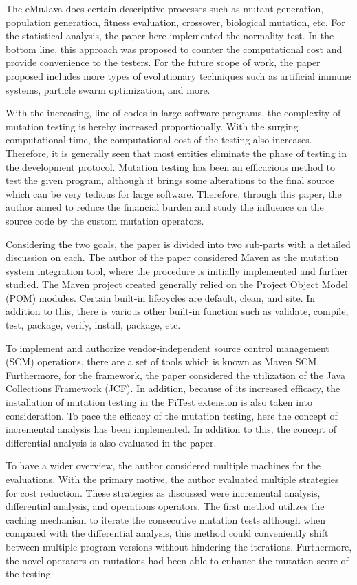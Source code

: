 The eMuJava does certain descriptive processes such as mutant generation, population generation, fitness evaluation, crossover, biological mutation, etc. For the statistical analysis, the paper here implemented the normality test. In the bottom line, this approach was proposed to counter the computational cost and provide convenience to the testers. For the future scope of work, the paper proposed includes more types of evolutionary techniques such as artificial immune systems, particle swarm optimization, and more.\par 
With the increasing, line of codes in large software programs, the complexity of mutation testing is hereby increased proportionally. With the surging computational time, the computational cost of the testing also increases. Therefore, it is generally seen that most entities eliminate the phase of testing in the development protocol. Mutation testing has been an efficacious method to test the given program, although it brings some alterations to the final source which can be very tedious for large software. Therefore, through this paper, the author aimed to reduce the financial burden and study the influence on the source code by the custom mutation operators.\par 
Considering the two goals, the paper is divided into two sub-parts with a detailed discussion on each. The author of the paper considered Maven as the mutation system integration tool, where the procedure is initially implemented and further studied. The Maven project created generally relied on the Project Object Model (POM) modules. Certain built-in lifecycles are default, clean, and site. In addition to this, there is various other built-in function such as validate, compile, test, package, verify, install, package, etc.\par 
To implement and authorize vendor-independent source control management (SCM) operations, there are a set of tools which is known as Maven SCM. Furthermore, for the framework, the paper considered the utilization of the Java Collections Framework (JCF). In addition, because of its increased efficacy, the installation of mutation testing in the PiTest extension is also taken into consideration. To pace the efficacy of the mutation testing, here the concept of incremental analysis has been implemented. In addition to this, the concept of differential analysis is also evaluated in the paper. \par 
To have a wider overview, the author considered multiple machines for the evaluations. With the primary motive, the author evaluated multiple strategies for cost reduction. These strategies as discussed were incremental analysis, differential analysis, and operations operators. The first method utilizes the caching mechanism to iterate the consecutive mutation tests although when compared with the differential analysis, this method could conveniently shift between multiple program versions without hindering the iterations. Furthermore, the novel operators on mutations had been able to enhance the mutation score of the testing.\par 
